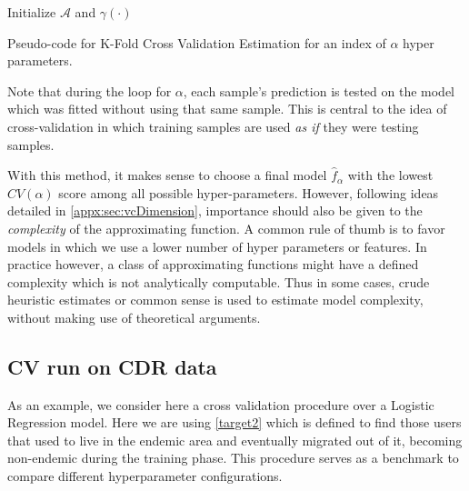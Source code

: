  \begin{algorithm}[H]
 \SetAlgoLined{}
 Initialize $\mathcal{A}$ and $\gamma(\cdot)$\;
 \caption{Pseudo-code for K-Fold Cross Validation Estimation for an index of $\alpha$ hyper parameters.}
 \end{algorithm}

Note that during the loop for $\alpha$, each sample's prediction is tested on the model which was fitted without using that same sample.
This is central to the idea of cross-validation in which training samples are used \textit{as if} they were testing samples.

With this method, it makes sense to choose a final model $\hat{f}_\alpha$ with the lowest $CV(\alpha)$ score among all possible hyper-parameters.
However, following ideas detailed in \cref{appx:sec:vcDimension}, importance should also be given to the \textit{complexity} of the approximating function.
A common rule of thumb is to favor models in which we use a lower number of hyper parameters or features.
In practice however, a class of approximating functions might have a defined complexity which is not analytically computable.
Thus in some cases, crude heuristic estimates or common sense is used to estimate model complexity, without making use of theoretical arguments.


\subsection{CV run on CDR data}\label{subsection:cvExperiment}

As an example, we consider here a cross validation procedure over a Logistic Regression model.
Here we are using \cref{target2} which is defined to find those users that used to live in the endemic area and eventually migrated out of it, becoming non-endemic during the training phase.
This procedure serves as a benchmark to compare different hyperparameter configurations.


